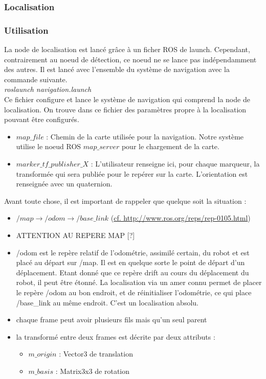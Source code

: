 \documentclass[10pt,a4paper]{article}
\begin{document}
\subsubsection{Localisation}
\label{sec:localision}

\subsubsection*{Utilisation}
La node de localisation est lancé gr\^ace à un ficher ROS de launch. Cependant, contrairement au noeud de détection, ce noeud ne se lance pas indépendamment des autres. Il est lancé avec l'ensemble du système de navigation avec la commande suivante.\\
\textit{roslaunch navigation.launch}\\

Ce fichier configure et lance le système de navigation qui comprend la node de localisation. 
On trouve dans ce fichier des paramètres propre à la localisation pouvant être configurés.

\begin{itemize}
\item $map\_file$ : Chemin de la carte utilisée pour la navigation. Notre système utilise le noeud ROS $map\_server$ pour le chargement de la carte.
\item $marker\_tf\_publisher\_X$ : L'utilisateur renseigne ici, pour chaque marqueur, la transformée qui sera publiée pour le repérer sur la carte. L'orientation est renseignée avec un quaternion. \\
\end{itemize}




\noindent Avant toute chose, il est important de rappeler que quelque soit la situation :
\begin{itemize}
\item $/map \rightarrow /odom \rightarrow /base\_link $ (\url{cf. http://www.ros.org/reps/rep-0105.html})
\item ATTENTION AU REPERE MAP [?]
\item /odom est le repère relatif de l'odométrie, assimilé certain, du robot et est placé au départ sur /map. Il est en quelque sorte le point de départ d'un déplacement. Etant donné que ce repère drift au cours du déplacement du robot, il peut être étonné. La localisation via un amer connu permet de placer le repère /odom au bon endroit, et de réinitialiser l'odométrie, ce qui place /base\_link au même endroit. C'est un localisation absolu.
\item chaque frame peut avoir plusieurs fils mais qu'un seul parent
\item la transformé entre deux frames est décrite par deux attributs : 
  \begin{itemize}
  \item $m\_origin$ : Vector3 de translation 
  \item $m\_basis$ : Matrix3x3 de rotation
  \end{itemize}
\end{itemize}
\end{document}
